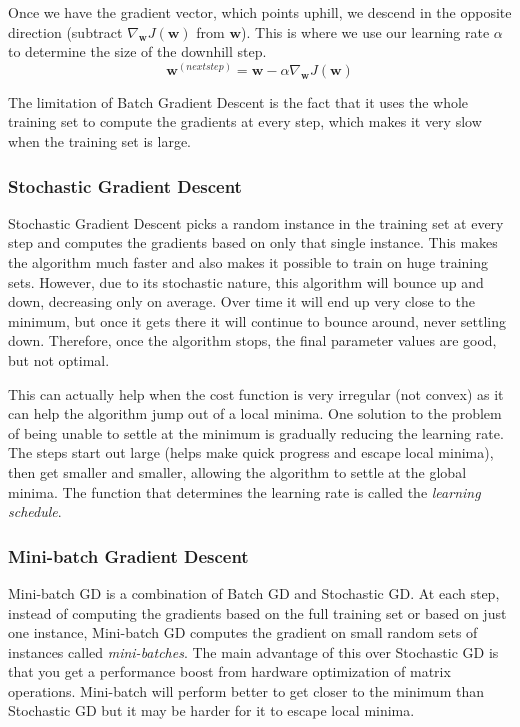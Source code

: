 \documentclass[12pt]{article}
\begin{document}
            Once we have the gradient vector, which points uphill, we descend in the opposite direction (subtract
            $\nabla_{\boldsymbol{w}} J(\boldsymbol{w})$ from $\boldsymbol{w}$). This is where we use our learning rate
            $\alpha$ to determine the size of the downhill step.
            $$ \boldsymbol{w}^{(next step)} = \boldsymbol{w} - \alpha \nabla_{\boldsymbol{w}} J(\boldsymbol{w}) $$

            The limitation of Batch Gradient Descent is the fact that it uses the whole training set to compute the
            gradients at every step, which makes it very slow when the training set is large.
        
        \subsubsection{Stochastic Gradient Descent}
            Stochastic Gradient Descent picks a random instance in the training set at every step and computes the
            gradients based on only that single instance. This makes the algorithm much faster and also makes it
            possible to train on huge training sets. However, due to its stochastic nature, this algorithm will bounce
            up and down, decreasing only on average. Over time it will end up very close to the minimum, but once it
            gets there it will continue to bounce around, never settling down. Therefore, once the algorithm stops, the
            final parameter values are good, but not optimal.

            This can actually help when the cost function is very irregular (not convex) as it can help the algorithm
            jump out of a local minima. One solution to the problem of being unable to settle at the minimum is
            gradually reducing the learning rate. The steps start out large (helps make quick progress and escape local
            minima), then get smaller and smaller, allowing the algorithm to settle at the global minima. The function
            that determines the learning rate is called the \textit{learning schedule}.
        
        \subsubsection{Mini-batch Gradient Descent}
            Mini-batch GD is a combination of Batch GD and Stochastic GD. At each step, instead of computing the
            gradients based on the full training set or based on just one instance, Mini-batch GD computes the gradient
            on small random sets of instances called \textit{mini-batches}. The main advantage of this over Stochastic
            GD is that you get a performance boost from hardware optimization of matrix operations. Mini-batch will
            perform better to get closer to the minimum than Stochastic GD but it may be harder for it to escape local
            minima.
    
\end{document}
